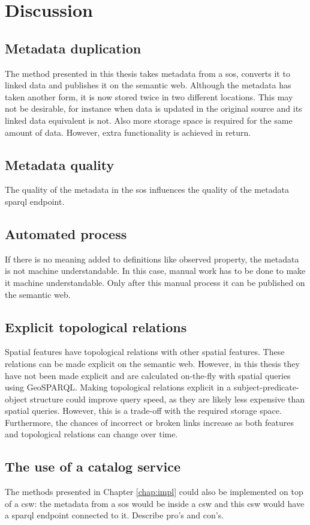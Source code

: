 
\chapter{Discussion}
\label{chap:disc}

\section*{Metadata duplication}
The method presented in this thesis takes metadata from a \ac{sos}, converts it to linked data and publishes it on the semantic web. Although the metadata has taken another form, it is now stored twice in two different locations. This may not be desirable, for instance when data is updated in the original source and its linked data equivalent is not. Also more storage space is required for the same amount of data. However, extra functionality is achieved in return.  

\section*{Metadata quality}
The quality of the metadata in the \ac{sos} influences the quality of the metadata \ac{sparql} endpoint. 

\section*{Automated process}
If there is no meaning added to definitions like observed property, the metadata is not machine understandable. In this case, manual work has to be done to make it machine understandable. Only after this manual process it can be published on the semantic web.

\section*{Explicit topological relations}
Spatial features have topological relations with other spatial features. These relations can be made explicit on the semantic web. However, in this thesis they have not been made explicit and are calculated on-the-fly with spatial queries using GeoSPARQL. Making topological relations explicit in a subject-predicate-object structure could improve query speed, as they are likely less expensive than spatial queries. However, this is a trade-off with the required storage space. Furthermore, the chances of incorrect or broken links increase as both features and topological relations can change over time.

\section*{The use of a catalog service}
The methods presented in Chapter \ref{chap:impl} could also be implemented on top of a \ac{csw}: the metadata from a \ac{sos} would be inside a \ac{csw} and this \ac{csw} would have a \ac{sparql} endpoint connected to it. Describe pro's and con's.